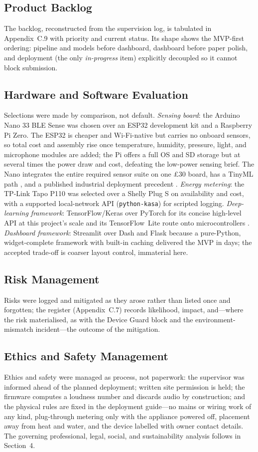 \documentclass[11pt,a4paper]{article}
\begin{document}
\subsection{Product Backlog}
The backlog, reconstructed from the supervision log, is tabulated in
Appendix~C.9 with priority and current status. Its shape shows the MVP-first
ordering: pipeline and models before dashboard, dashboard before paper polish,
and deployment (the only \emph{in-progress} item) explicitly decoupled so it
cannot block submission.

\subsection{Hardware and Software Evaluation}
Selections were made by comparison, not default. \emph{Sensing board}: the
Arduino Nano 33 BLE Sense was chosen over an ESP32 development kit and a
Raspberry Pi Zero. The ESP32 is cheaper and Wi-Fi-native but carries no onboard
sensors, so total cost and assembly rise once temperature, humidity, pressure,
light, and microphone modules are added; the Pi offers a full OS and SD storage
but at several times the power draw and cost, defeating the low-power sensing
brief. The Nano integrates the entire required sensor suite on one \pounds30
board, has a TinyML path \cite{warden2019tinyml}, and a published industrial
deployment precedent \cite{baskar2024edge}. \emph{Energy metering}: the TP-Link
Tapo P110 was selected over a Shelly Plug S on availability and cost, with a
supported local-network API (\texttt{python-kasa}) for scripted logging.
\emph{Deep-learning framework}: TensorFlow/Keras over PyTorch for its concise
high-level API at this project's scale and its TensorFlow~Lite route onto
microcontrollers \cite{abadi2016tensorflow}. \emph{Dashboard framework}:
Streamlit over Dash and Flask because a pure-Python, widget-complete framework
with built-in caching delivered the MVP in days; the accepted trade-off is
coarser layout control, immaterial here.

\subsection{Risk Management}
Risks were logged and mitigated as they arose rather than listed once and
forgotten; the register (Appendix~C.7) records likelihood, impact, and---where
the risk materialised, as with the Device Guard block and the
environment-mismatch incident---the outcome of the mitigation.

\subsection{Ethics and Safety Management}
Ethics and safety were managed as process, not paperwork: the supervisor was
informed ahead of the planned deployment; written site permission is held; the
firmware computes a loudness number and discards audio by construction; and the
physical rules are fixed in the deployment guide---no mains or wiring work of
any kind, plug-through metering only with the appliance powered off, placement
away from heat and water, and the device labelled with owner contact details.
The governing professional, legal, social, and sustainability analysis follows
in Section~4.
\end{document}
